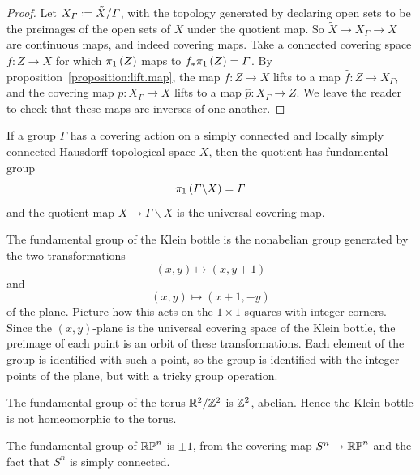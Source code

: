 \begin{proof}
Let \(X_{\Gamma}\defeq \tilde{X}/\Gamma\), with the topology generated by declaring open sets to be the preimages of the open sets of \(X\) under the quotient map.
So \(\tilde{X} \to X_{\Gamma} \to X\) are continuous maps, and indeed covering maps.
Take a connected covering space \(f \colon Z \to X\) for which \(\pi_{1}\left(Z\right)\) maps to \(f_* \pi_{1}\left(Z\right) = \Gamma\).
By proposition~\vref{proposition:lift.map}, the map \(f \colon Z \to X\) lifts to a map \(\hat{f} \colon Z \to X_{\Gamma}\), and the covering map \(p \colon X_{\Gamma} \to X\) lifts to a map \(\hat{p} \colon X_{\Gamma} \to Z\).
We leave the reader to check that these maps are inverses of one another.
\end{proof}
\begin{corollary}\label{corollary:quotient.f.g}
If a group \(\Gamma\) has a covering action on a simply connected and locally simply connected Hausdorff topological space \(X\), then the quotient has fundamental group
\[
\pi_{1}\left(\Gamma\backslash X\right)=\Gamma
\]
and the quotient map \(X \to \Gamma\backslash X\) is the universal covering map.
\end{corollary}
\begin{example}
The fundamental group of the Klein bottle is the nonabelian group generated by the two transformations
\[
(x,y) \mapsto (x,y+1)
\]
and
\[
(x,y) \mapsto (x+1,-y)
\]
of the plane.
Picture how this acts on the \(1 \times 1\) squares with integer corners.
Since the \((x,y)\)-plane is the universal covering space of the Klein bottle, the preimage of each point is an orbit of these transformations.
Each element of the group is identified with such a point, so the group is identified with the integer points of the plane, but with a tricky group operation.
\end{example}
\begin{example}
The fundamental group of the torus \(\mathbb{R}^{2}/\mathbb{Z}^{2}\) is \(\mathbb{Z}^{2}\), abelian.
Hence the Klein bottle is not homeomorphic to the torus.
\end{example}
\begin{example}\label{example:rpn.pi.1}
The fundamental group of \(\mathbb{RP}^{n}\) is \(\pm 1\), from the covering map \(S^n \to \mathbb{RP}^{n}\) and the fact that \(S^n\) is simply connected.
\end{example}

